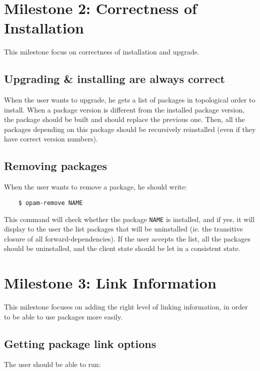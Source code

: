 \documentclass[a4paper,11pt]{article}
\begin{document}
\begin{itemize}
\section{Milestone 2: Correctness of Installation}

This milestone focus on correctness of installation and upgrade.

\subsection{Upgrading \& installing are always correct}

When the user wants to upgrade, he gets a list of packages in
topological order to install. When a package version is different from
the installed package version, the package should be built and should
replace the previous one. Then, all the packages depending on this
package should be recursively reinstalled (even if they have correct
version numbers).

\subsection{Removing packages}

When the user wants to remove a package, he should write:

\begin{verbatim}
    $ opam-remove NAME
\end{verbatim}

This command will check whether the package {\tt NAME} is installed,
and if yes, it will display to the user the list packages that will be
uninstalled (ie. the transitive closure of all forward-dependencies).
If the user accepts the list, all the packages should be uninstalled,
and the client state should be let in a consistent state.

\section{Milestone 3: Link Information}

This milestone focuses on adding the right level of linking
information, in order to be able to use packages more easily.

\subsection{Getting package link options}

The user should be able to run:


\end{itemize}
\end{document}
